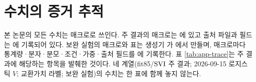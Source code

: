 \chapter{수치의 증거 추적}
\label{app:trace}

본 논문의 모든 수치는 매크로로 쓰인다. 주 결과의 매크로는 에 있고 출처 파일과 필드는 에 기록되어 있다. 보완 실험의 매크로와 표는 생성기 가 에서 만들며, 매크로마다 통계량·분자·분모·조건·가중·출처 필드를 에 기록한다. 표 \ref{tab:app-trace}는 주 결과에 해당하는 항목을 발췌한 것이다. 네 계열(fit85/$\mathrm{SVI}$ 주 결과; 2026-09-15 로지스틱 $V$;  교환가치 라벨; 보완 실험)의 수치는 한 표에 함께 놓지 않는다.

